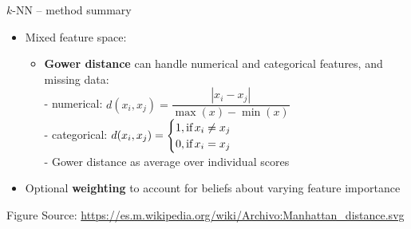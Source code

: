 \documentclass[11pt,compress,t,notes=noshow, xcolor=table]{beamer}
\begin{document}
\begin{vbframe}{$k$-NN -- method summary}
\begin{itemize}
    \framebreak

  \item Mixed feature space: 
  \begin{itemize}
      \item \textbf{Gower distance} can handle numerical and categorical features, and missing data:\\ %
            - numerical: $d(x_i,x_j) =  \dfrac{|x_i-x_j|}{\max(x)-\min(x)}$\\
            - categorical: $d(x_i,x_j) =
            \begin{cases}
              1, \text{if\,} x_i \neq x_j\\
              0, \text{if\,} x_i = x_j
            \end{cases}$\\
            - Gower distance as average over individual scores
  \end{itemize}
  \item Optional \textbf{weighting} to account for beliefs about varying feature
  importance
\end{itemize}
\vfill
  {\tiny Figure Source: \href{https://es.m.wikipedia.org/wiki/Archivo:Manhattan_distance.svg}{https://es.m.wikipedia.org/wiki/Archivo:Manhattan\_distance.svg}}

\end{vbframe}
\end{document}
